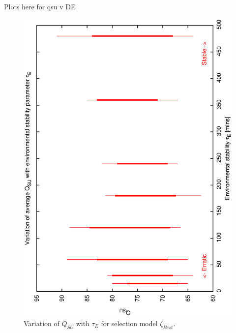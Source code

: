 Plots here for qsu v DE

\begin{figure}[h]
 \label{fig:qsu_de_best}
\begin{center}
 \includegraphics[scale=0.5, angle=-90]{figures/best_de.eps}
 \caption[Variation of $Q_{SU}$ with $\tau_E$ for selection model $\zeta_{Best}$.] 
   {Variation of $Q_{SU}$ with $\tau_E$ for selection model $\zeta_{Best}$.}
\end{center}
\end{figure}

